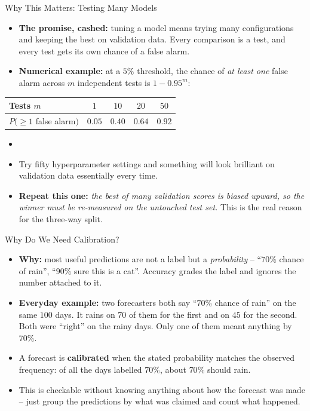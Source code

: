 \begin{frame}{Why This Matters: Testing Many Models}
\begin{itemize}
  \item \textbf{The promise, cashed:} tuning a model means trying many configurations and keeping the best on validation data. Every comparison is a test, and every test gets its own chance of a false alarm.
  \pause
  \item \textbf{Numerical example:} at a $5\%$ threshold, the chance of \emph{at least one} false alarm across $m$ independent tests is $1 - 0.95^{m}$:
\end{itemize}
\centering
\small
\begin{tabular}{l|cccc}
Tests $m$              & $1$ & $10$ & $20$ & $50$ \\
\hline
$P(\ge 1$ false alarm$)$ & $0.05$ & $0.40$ & $0.64$ & $0.92$ \\
\end{tabular}

\vspace{0.4em}
\raggedright
\begin{itemize}
  \item[] \pause
  \item Try fifty hyperparameter settings and something will look brilliant on validation data essentially every time. \pause
  \item \textbf{Repeat this one:} \emph{the best of many validation scores is biased upward, so the winner must be re-measured on the untouched test set.} This is the real reason for the three-way split.
\end{itemize}
\end{frame}

\begin{frame}{Why Do We Need Calibration?}
\begin{itemize}
  \item \textbf{Why:} most useful predictions are not a label but a \emph{probability} -- ``$70\%$ chance of rain'', ``$90\%$ sure this is a cat''. Accuracy grades the label and ignores the number attached to it.
  \pause
  \item \textbf{Everyday example:} two forecasters both say ``$70\%$ chance of rain'' on the same $100$ days. It rains on $70$ of them for the first and on $45$ for the second. Both were ``right'' on the rainy days. Only one of them meant anything by $70\%$.
  \pause
  \item A forecast is \textbf{calibrated} when the stated probability matches the observed frequency: of all the days labelled $70\%$, about $70\%$ should rain.
  \pause
  \item This is checkable without knowing anything about how the forecast was made -- just group the predictions by what was claimed and count what happened.
\end{itemize}
\end{frame}

